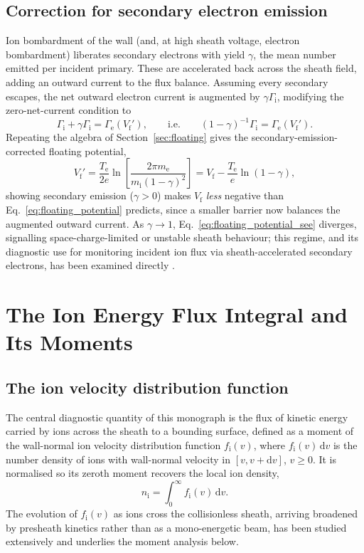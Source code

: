 \subsection{Correction for secondary electron emission}

Ion bombardment of the wall (and, at high sheath voltage, electron bombardment) liberates secondary electrons with yield $\gamma$, the mean number emitted per incident primary. These are accelerated back across the sheath field, adding an outward current to the flux balance. Assuming every secondary escapes, the net outward electron current is augmented by $\gamma\Gamma_{\mathrm{i}}$, modifying the zero-net-current condition to
\begin{equation}
\Gamma_{\mathrm{i}} + \gamma\Gamma_{\mathrm{i}} = \Gamma_{\mathrm{e}}(V_{\mathrm{f}}'),
\qquad\text{i.e.}\qquad
(1-\gamma)^{-1}\Gamma_{\mathrm{i}} = \Gamma_{\mathrm{e}}(V_{\mathrm{f}}').
\end{equation}
Repeating the algebra of Section~\ref{sec:floating} gives the secondary-emission-corrected floating potential,
\begin{equation}
V_{\mathrm{f}}' = \frac{T_{\mathrm{e}}}{2e}\ln\!\left[\frac{2\pi m_{\mathrm{e}}}{m_{\mathrm{i}}(1-\gamma)^{2}}\right] = V_{\mathrm{f}} - \frac{T_{\mathrm{e}}}{e}\ln(1-\gamma),
\label{eq:floating_potential_see}
\end{equation}
showing secondary emission ($\gamma>0$) makes $V_{\mathrm{f}}$ \emph{less} negative than Eq.~\eqref{eq:floating_potential} predicts, since a smaller barrier now balances the augmented outward current. As $\gamma \to 1$, Eq.~\eqref{eq:floating_potential_see} diverges, signalling space-charge-limited or unstable sheath behaviour; this regime, and its diagnostic use for monitoring incident ion flux via sheath-accelerated secondary electrons, has been examined directly \cite{ref0078}.

\section{The Ion Energy Flux Integral and Its Moments}
\label{sec:flux}

\subsection{The ion velocity distribution function}

The central diagnostic quantity of this monograph is the flux of kinetic energy carried by ions across the sheath to a bounding surface, defined as a moment of the wall-normal ion velocity distribution function $f_{\mathrm{i}}(v)$, where $f_{\mathrm{i}}(v)\,\mathrm{d}v$ is the number density of ions with wall-normal velocity in $[v, v+\mathrm{d}v]$, $v \ge 0$. It is normalised so its zeroth moment recovers the local ion density,
\begin{equation}
n_{\mathrm{i}} = \int_{0}^{\infty} f_{\mathrm{i}}(v)\,\mathrm{d}v.
\label{appA-eq:moment0}
\end{equation}
The evolution of $f_{\mathrm{i}}(v)$ as ions cross the collisionless sheath, arriving broadened by presheath kinetics rather than as a mono-energetic beam, has been studied extensively \cite{ref0090,ref0672} and underlies the moment analysis below.

